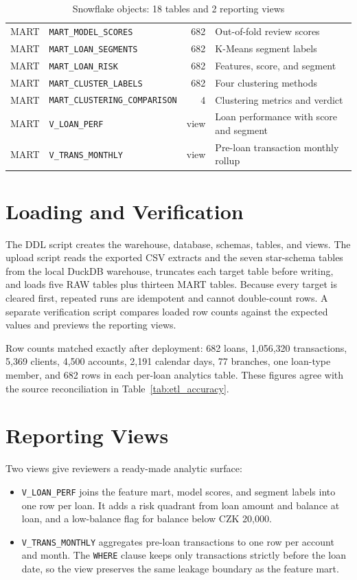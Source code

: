 \begin{table}[H]
\begin{tabularx}{\textwidth}{|l|l|r|X|}
        MART & \texttt{MART\_MODEL\_SCORES} & 682 & Out-of-fold review scores \\
        MART & \texttt{MART\_LOAN\_SEGMENTS} & 682 & K-Means segment labels \\
        MART & \texttt{MART\_LOAN\_RISK} & 682 & Features, score, and segment \\
        MART & \texttt{MART\_CLUSTER\_LABELS} & 682 & Four clustering methods \\
        MART & \texttt{MART\_CLUSTERING\_COMPARISON} & 4 & Clustering metrics and verdict \\
        MART & \texttt{V\_LOAN\_PERF} & view & Loan performance with score and segment \\
        MART & \texttt{V\_TRANS\_MONTHLY} & view & Pre-loan transaction monthly rollup \\
        \hline
    \end{tabularx}
    \caption{Snowflake objects: 18 tables and 2 reporting views}
    \label{tab:snowflake_objects}
\end{table}

\section{Loading and Verification}
The DDL script creates the warehouse, database, schemas, tables, and views. The upload script reads the exported CSV extracts and the seven star-schema tables from the local DuckDB warehouse, truncates each target table before writing, and loads five RAW tables plus thirteen MART tables. Because every target is cleared first, repeated runs are idempotent and cannot double-count rows. A separate verification script compares loaded row counts against the expected values and previews the reporting views.

Row counts matched exactly after deployment: 682 loans, 1,056,320 transactions, 5,369 clients, 4,500 accounts, 2,191 calendar days, 77 branches, one loan-type member, and 682 rows in each per-loan analytics table. These figures agree with the source reconciliation in Table~\ref{tab:etl_accuracy}.

\section{Reporting Views}
Two views give reviewers a ready-made analytic surface:
\begin{itemize}
    \item \texttt{V\_LOAN\_PERF} joins the feature mart, model scores, and segment labels into one row per loan. It adds a risk quadrant from loan amount and balance at loan, and a low-balance flag for balance below CZK 20,000.
    \item \texttt{V\_TRANS\_MONTHLY} aggregates pre-loan transactions to one row per account and month. The \texttt{WHERE} clause keeps only transactions strictly before the loan date, so the view preserves the same leakage boundary as the feature mart.
\end{itemize}

